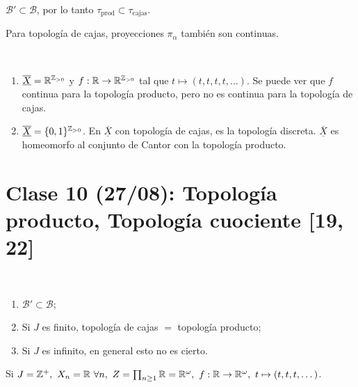 \documentclass[a4paper]{report}
\begin{document}
\begin{corollary}
	$\mathcal{B}' \subset \mathcal{B}$, por lo tanto $\tau_{\text{prod}} \subset \tau_{\text{cajas}}$.
\end{corollary}

\begin{corollary}
	Para topología de cajas, proyecciones $\pi_{\alpha}$ también son continuas.
\end{corollary}

\begin{eg}~
	\begin{enumerate}
		\item $\underline{\overline{X}} = \mathbb{R}^{\mathbb{Z}_{>0}}$ y $f : \mathbb{R} \to \mathbb{R}^{\mathbb{Z}_{>0}}$ tal que $t \mapsto (t,t,t,t,\dots)$. Se puede ver que $f$ continua para la topología producto, pero no es continua para la topología de cajas.

		\item $\underline{\overline{X}} = \{ 0,1 \}^{\mathbb{Z}_{>0}}$. En $\underline{\overline{X}}$ con topología de cajas, es la topología discreta. $\underline{\overline{X}}$ es homeomorfo al conjunto de Cantor con la topología producto.  
	\end{enumerate}
\end{eg}


\section{Clase 10 (27/08): Topología producto, Topología cuociente [19, 22]}

\begin{remark}~
	\begin{enumerate}
		\item $\mathcal{B}' \subset \mathcal{B}$;

		\item Si $J$ es finito, topología de cajas $=$ topología producto;

		\item Si $J$ es infinito, en general esto no es cierto.
	\end{enumerate}
\end{remark}

\begin{eg}
	Si $J = \mathbb{Z}^+,\ X_n = \mathbb{R} \ \forall n,\ Z = \prod_{n\geq 1} \mathbb{R} = \mathbb{R}^{\omega},\ f: \mathbb{R} \to \mathbb{R}^{\omega},\ t \mapsto (t,t,t,\dots)$.
\end{eg}
\end{document}
